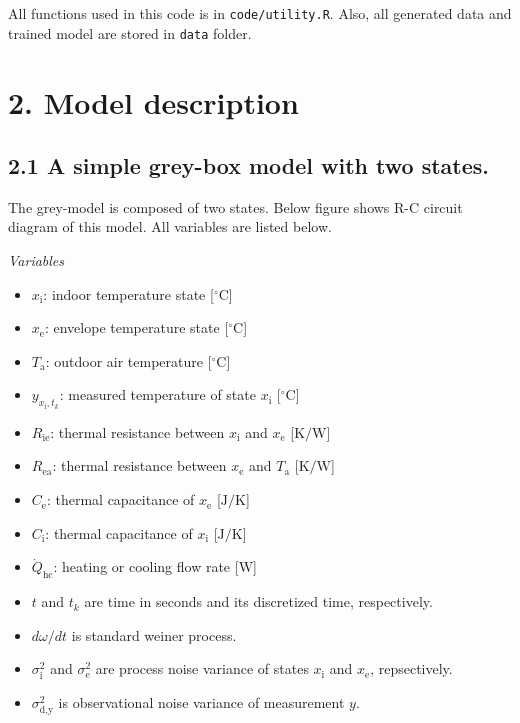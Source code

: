 \documentclass[
]{article}
\providecommand{\tightlist}{%
  \setlength{\itemsep}{0pt}\setlength{\parskip}{0pt}}
\begin{document}
All functions used in this code is in \texttt{code/utility.R}. Also, all
generated data and trained model are stored in \texttt{data} folder.

\hypertarget{model-description}{%
\section{2. Model description}\label{model-description}}

\hypertarget{a-simple-grey-box-model-with-two-states.}{%
\subsection{2.1 A simple grey-box model with two
states.}\label{a-simple-grey-box-model-with-two-states.}}

The grey-model is composed of two states. Below figure shows R-C circuit
diagram of this model. All variables are listed below.

\emph{Variables}

\begin{itemize}
\tightlist
\item
  \(x_{\text{i}}\): indoor temperature state {[}\(^\circ\text{C}\){]}
\item
  \(x_{\text{e}}\): envelope temperature state {[}\(^\circ\text{C}\){]}
\item
  \(T_{\text{a}}\): outdoor air temperature {[}\(^\circ\text{C}\){]}
\item
  \(y_{x_\text{i},t_k}\): measured temperature of state \(x_{\text{i}}\)
  {[}\(^\circ\text{C}\){]}
\item
  \(R_{\text{ie}}\): thermal resistance between \(x_{\text{i}}\) and
  \(x_{\text{e}}\) {[}\(\text{K/W}\){]}
\item
  \(R_{\text{ea}}\): thermal resistance between \(x_{\text{e}}\) and
  \(T_{\text{a}}\) {[}\(\text{K/W}\){]}
\item
  \(C_{\text{e}}\): thermal capacitance of \(x_{\text{e}}\)
  {[}\(\text{J/K}\){]}
\item
  \(C_{\text{i}}\): thermal capacitance of \(x_{\text{i}}\)
  {[}\(\text{J/K}\){]}
\item
  \(\dot{Q}_{\text{hc}}\): heating or cooling flow rate
  {[}\(\text{W}\){]}
\item
  \(t\) and \(t_k\) are time in seconds and its discretized time,
  respectively.
\item
  \(d\omega/dt\) is standard weiner process.
\item
  \(\sigma_\text{i}^2\) and \(\sigma_\text{e}^2\) are process noise
  variance of states \(x_{\text{i}}\) and \(x_{\text{e}}\),
  repsectively.
\item
  \(\sigma_\text{d,y}^2\) is observational noise variance of measurement
  \(y\).
\end{itemize}
\end{document}
